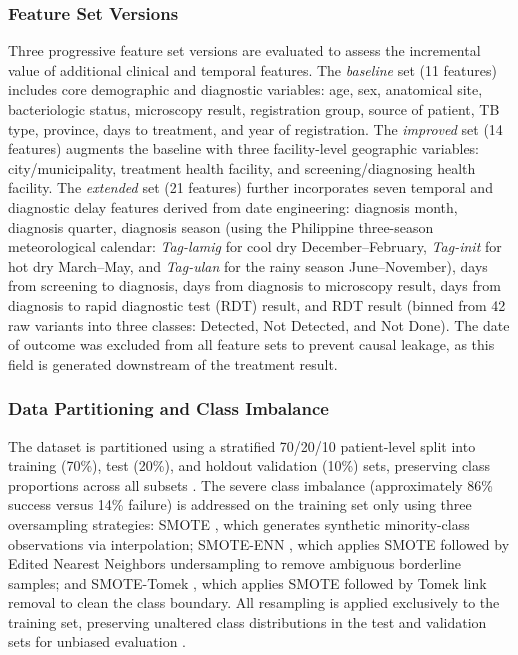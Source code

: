 \documentclass[12pt]{article}
\begin{document}
\subsubsection{Feature Set Versions}

Three progressive feature set versions are evaluated to assess the incremental value of additional clinical and temporal features. The \textit{baseline} set (11 features) includes core demographic and diagnostic variables: age, sex, anatomical site, bacteriologic status, microscopy result, registration group, source of patient, TB type, province, days to treatment, and year of registration. The \textit{improved} set (14 features) augments the baseline with three facility-level geographic variables: city/municipality, treatment health facility, and screening/diagnosing health facility. The \textit{extended} set (21 features) further incorporates seven temporal and diagnostic delay features derived from date engineering: diagnosis month, diagnosis quarter, diagnosis season (using the Philippine three-season meteorological calendar: \textit{Tag-lamig} for cool dry December--February, \textit{Tag-init} for hot dry March--May, and \textit{Tag-ulan} for the rainy season June--November), days from screening to diagnosis, days from diagnosis to microscopy result, days from diagnosis to rapid diagnostic test (RDT) result, and RDT result (binned from 42 raw variants into three classes: Detected, Not Detected, and Not Done). The date of outcome was excluded from all feature sets to prevent causal leakage, as this field is generated downstream of the treatment result.

\subsubsection{Data Partitioning and Class Imbalance}

The dataset is partitioned using a stratified 70/20/10 patient-level split into training (70\%), test (20\%), and holdout validation (10\%) sets, preserving class proportions across all subsets \citep{hastie2009elements}. The severe class imbalance (approximately 86\% success versus 14\% failure) is addressed on the training set only using three oversampling strategies: SMOTE \citep{chawla2002smote}, which generates synthetic minority-class observations via interpolation; SMOTE-ENN \citep{batista2004study,nishat2022smoteenn}, which applies SMOTE followed by Edited Nearest Neighbors undersampling to remove ambiguous borderline samples; and SMOTE-Tomek \citep{batista2004study}, which applies SMOTE followed by Tomek link removal to clean the class boundary. All resampling is applied exclusively to the training set, preserving unaltered class distributions in the test and validation sets for unbiased evaluation \citep{salmi2024imbalanced}.
\end{document}
